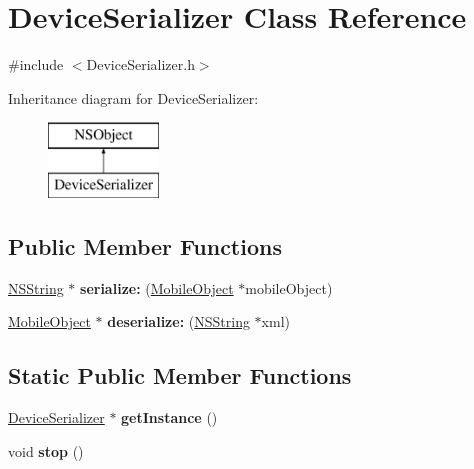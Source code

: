 \hypertarget{interface_device_serializer}{
\section{\-Device\-Serializer \-Class \-Reference}
\label{interface_device_serializer}
}


{\ttfamily \#include $<$\-Device\-Serializer.\-h$>$}

\-Inheritance diagram for \-Device\-Serializer\-:\begin{figure}[H]
\begin{center}
\leavevmode
\includegraphics[height=2.000000cm]{interface_device_serializer}
\end{center}
\end{figure}
\subsection*{\-Public \-Member \-Functions}
\begin{DoxyCompactItemize}
\item 
\hypertarget{interface_device_serializer_a4c2befa4c03252893a258a355b0779ba}{
\hyperlink{class_n_s_string}{\-N\-S\-String} $\ast$ {\bfseries serialize\-:} (\hyperlink{interface_mobile_object}{\-Mobile\-Object} $\ast$mobile\-Object)}
\label{interface_device_serializer_a4c2befa4c03252893a258a355b0779ba}

\item 
\hypertarget{interface_device_serializer_a20c5d36f5b798f86062ae428626e07ab}{
\hyperlink{interface_mobile_object}{\-Mobile\-Object} $\ast$ {\bfseries deserialize\-:} (\hyperlink{class_n_s_string}{\-N\-S\-String} $\ast$xml)}
\label{interface_device_serializer_a20c5d36f5b798f86062ae428626e07ab}

\end{DoxyCompactItemize}
\subsection*{\-Static \-Public \-Member \-Functions}
\begin{DoxyCompactItemize}
\item 
\hypertarget{interface_device_serializer_ae6fdc6a660af32bdddb3b34a74666ea4}{
\hyperlink{interface_device_serializer}{\-Device\-Serializer} $\ast$ {\bfseries get\-Instance} ()}
\label{interface_device_serializer_ae6fdc6a660af32bdddb3b34a74666ea4}

\item 
\hypertarget{interface_device_serializer_a696da8c2380932347ca6129db8cb9e25}{
void {\bfseries stop} ()}
\label{interface_device_serializer_a696da8c2380932347ca6129db8cb9e25}

\end{DoxyCompactItemize}


